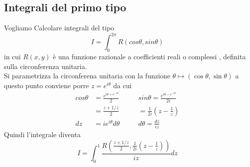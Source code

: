 \documentclass{article}
\theoremstyle{definition}
\begin{document}
\subsection{Integrali del primo tipo}
Vogliamo Calcolare integrali del tipo 
$$I=\int_{0}^{2 \pi} R(cos\theta,sin\theta)$$
in cui $R(x,y)$ è una funzione razionale a coefficienti reali o complessi , definita sulla circonferenza unitaria. 
\\ Si parametrizza la circonferena unitaria con la funzione 
$\theta \mapsto (\cos \theta , \sin \theta)$ a questo punto conviene porre $z=e^{i\theta}$ da cui  \begin{align*}
	cos\theta&=\frac{e^{i\theta+e^{-i\theta}}}{2} \ \ \ \ \ \ \ \  \	&sin\theta=\frac{e^{i\theta-e^{-i\theta}}}{2i}  \\
	&=\frac{z+1/z}{2} &=\frac{1}{2i}(z-\frac{1}{z}) \\ 
	dz&=i e^{i\theta}d\theta &d\theta=\frac{dz}{iz} 
\end{align*}
Quindi l'integrale diventa 
$$I=\int_{0}^{1}\frac{R(\frac{z+1/z}{2}, \frac{1}{2i}(z-\frac{1}{z}))}{iz}dz$$
\end{document}
